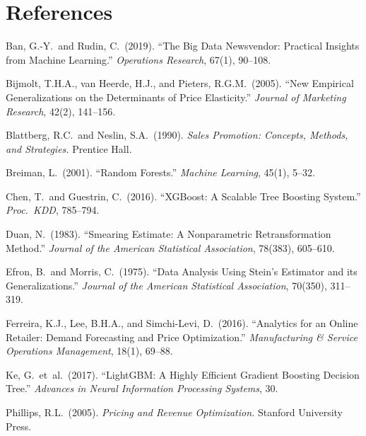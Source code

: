 \documentclass[12pt,a4paper]{article}
\begin{document}
\section*{References}

\begin{enumerate}[label={[\arabic*]}, nosep, leftmargin=*]
\item Ban, G.-Y.\ and Rudin, C.\ (2019). ``The Big Data Newsvendor:
Practical Insights from Machine Learning.'' \textit{Operations
Research}, 67(1), 90--108.

\item Bijmolt, T.H.A., van Heerde, H.J., and Pieters, R.G.M.\
(2005). ``New Empirical Generalizations on the Determinants of Price
Elasticity.'' \textit{Journal of Marketing Research}, 42(2), 141--156.

\item Blattberg, R.C.\ and Neslin, S.A.\ (1990).
\textit{Sales Promotion: Concepts, Methods, and Strategies.}
Prentice Hall.

\item Breiman, L.\ (2001). ``Random Forests.''
\textit{Machine Learning}, 45(1), 5--32.

\item Chen, T.\ and Guestrin, C.\ (2016). ``XGBoost: A Scalable Tree
Boosting System.'' \textit{Proc.\ KDD}, 785--794.

\item Duan, N.\ (1983). ``Smearing Estimate: A Nonparametric
Retransformation Method.'' \textit{Journal of the American Statistical
Association}, 78(383), 605--610.

\item Efron, B.\ and Morris, C.\ (1975). ``Data Analysis Using
Stein's Estimator and its Generalizations.'' \textit{Journal of the
American Statistical Association}, 70(350), 311--319.

\item Ferreira, K.J., Lee, B.H.A., and Simchi-Levi, D.\ (2016).
``Analytics for an Online Retailer: Demand Forecasting and Price
Optimization.'' \textit{Manufacturing \& Service Operations
Management}, 18(1), 69--88.

\item Ke, G.\ et~al.\ (2017). ``LightGBM: A Highly Efficient
Gradient Boosting Decision Tree.'' \textit{Advances in Neural
Information Processing Systems}, 30.

\item Phillips, R.L.\ (2005). \textit{Pricing and Revenue
Optimization.} Stanford University Press.


\end{enumerate}
\end{document}
